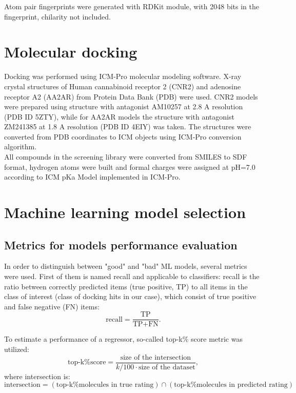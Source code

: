 Atom pair fingerprints were generated with RDKit module, with 2048 bits in the fingerprint, chilarity not included.

\section{Molecular docking}
Docking was performed using ICM-Pro molecular modeling software.
X-ray crystal structures of Human cannabinoid receptor 2 (CNR2) and adenosine receptor A2 (AA2AR) from Protein Data Bank (PDB) were used.
CNR2 models were prepared using structure with antagonist AM10257 at 2.8 A resolution (PDB ID 5ZTY), while for AA2AR models the structure with antagonist ZM241385 at 1.8 A resolution (PDB ID 4EIY) was taken.
The structures were converted from PDB coordinates to ICM objects using ICM-Pro conversion algorithm.\\

All compounds in the screening library were converted from SMILES to SDF format, hydrogen atoms were built and formal charges were assigned at pH=7.0 according to ICM pKa Model implemented in ICM-Pro.

\section{Machine learning model selection}

\subsection{Metrics for models performance evaluation}
In order to distinguish between "good" and "bad" ML models, several metrics were used.
First of them is named recall and applicable to classifiers: recall is the ratio between correctly predicted items (true positive, TP) to all items in the class of interest (class of docking hits in our case), which consist of true positive and false negative (FN) items:
\begin{equation*}
    \text{recall} = \frac{\text{TP}}{\text{TP} + \text{FN}}.
\end{equation*}

To estimate a performance of a regressor, so-called top-k\% score metric was utilized:
\begin{equation*}
\text{top-k\% score} = \frac{\text{size of the intersection}}{k/100 \cdot \text{size of the dataset}},
\end{equation*}
where intersection is:
\begin{equation*}
         \text{intersection} = \left( \text{top-k\% molecules in true rating}\right) \cap \left( \text{top-k\% molecules in predicted rating}\right)
\end{equation*}

